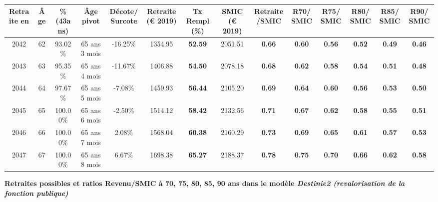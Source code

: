 \begin{adjustbox}{max width=\textwidth} 
\begin{tabular}[htb]{|c|c||c|c|c||c|c||c|c||c|c|c|c|c|} 
\hline 
 Retraite en &  Âge &  \%(43ans) &  Âge pivot &  Décote/Surcote &  Retraite (\euro{} 2019) &  Tx Rempl(\%) &  SMIC (\euro{} 2019) &  Retraite/SMIC &  R70/SMIC &  R75/SMIC &  R80/SMIC &  R85/SMIC &  R90/SMIC \\ 
\hline \hline 
 2042 &  62 &  93.02\% &  65 ans 3 mois &  -16.25\% &  1354.95 &  {\bf 52.59} &  2051.51 &  {\bf {\color{red} 0.66}} &  {\bf {\color{red} 0.60}} &  {\bf {\color{red} 0.56}} &  {\bf {\color{red} 0.52}} &  {\bf {\color{red} 0.49}} &  {\bf {\color{red} 0.46}} \\ 
\hline 
 2043 &  63 &  95.35\% &  65 ans 4 mois &  -11.67\% &  1406.88 &  {\bf 54.50} &  2078.18 &  {\bf {\color{red} 0.68}} &  {\bf {\color{red} 0.62}} &  {\bf {\color{red} 0.58}} &  {\bf {\color{red} 0.54}} &  {\bf {\color{red} 0.51}} &  {\bf {\color{red} 0.48}} \\ 
\hline 
 2044 &  64 &  97.67\% &  65 ans 5 mois &  -7.08\% &  1459.93 &  {\bf 56.44} &  2105.20 &  {\bf {\color{red} 0.69}} &  {\bf {\color{red} 0.64}} &  {\bf {\color{red} 0.60}} &  {\bf {\color{red} 0.56}} &  {\bf {\color{red} 0.53}} &  {\bf {\color{red} 0.50}} \\ 
\hline 
 2045 &  65 &  100.00\% &  65 ans 6 mois &  -2.50\% &  1514.12 &  {\bf 58.42} &  2132.56 &  {\bf {\color{red} 0.71}} &  {\bf {\color{red} 0.67}} &  {\bf {\color{red} 0.62}} &  {\bf {\color{red} 0.58}} &  {\bf {\color{red} 0.55}} &  {\bf {\color{red} 0.51}} \\ 
\hline 
 2046 &  66 &  100.00\% &  65 ans 7 mois &  2.08\% &  1568.04 &  {\bf 60.38} &  2160.29 &  {\bf {\color{red} 0.73}} &  {\bf {\color{red} 0.69}} &  {\bf {\color{red} 0.65}} &  {\bf {\color{red} 0.61}} &  {\bf {\color{red} 0.57}} &  {\bf {\color{red} 0.53}} \\ 
\hline 
 2047 &  67 &  100.00\% &  65 ans 8 mois &  6.67\% &  1698.38 &  {\bf 65.27} &  2188.37 &  {\bf {\color{red} 0.78}} &  {\bf {\color{red} 0.75}} &  {\bf {\color{red} 0.70}} &  {\bf {\color{red} 0.66}} &  {\bf {\color{red} 0.62}} &  {\bf {\color{red} 0.58}} \\ 
\hline 
\hline 
\end{tabular} 
\end{adjustbox} 
 
 \vspace{0.1cm} 
{\bf \noindent Retraites possibles et ratios Revenu/SMIC à 70, 75, 80, 85, 90 ans dans le modèle \emph{Destinie2 (revalorisation de la fonction publique)}}  
 
